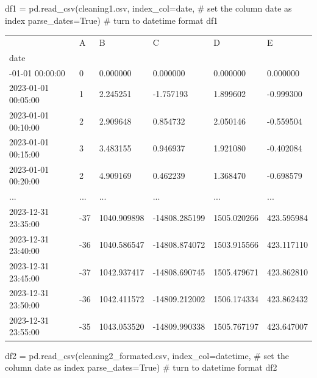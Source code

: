 \documentclass[
  letterpaper,
  DIV=11,
  numbers=noendperiod,
  oneside]{scrreprt}
\newenvironment{Shaded}{\begin{snugshade}}{\end{snugshade}}
\newcommand{\CommentTok}[1]{\textcolor[rgb]{0.37,0.37,0.37}{#1}}
\newcommand{\NormalTok}[1]{\textcolor[rgb]{0.00,0.23,0.31}{#1}}
\newcommand{\OperatorTok}[1]{\textcolor[rgb]{0.37,0.37,0.37}{#1}}
\newcommand{\StringTok}[1]{\textcolor[rgb]{0.13,0.47,0.30}{#1}}
\newcommand{\VariableTok}[1]{\textcolor[rgb]{0.07,0.07,0.07}{#1}}
\begin{document}
\begin{Shaded}
\begin{Highlighting}[]
\NormalTok{df1 }\OperatorTok{=}\NormalTok{ pd.read\_csv(}\StringTok{\textquotesingle{}cleaning1.csv\textquotesingle{}}\NormalTok{, }
\NormalTok{                  index\_col}\OperatorTok{=}\StringTok{\textquotesingle{}date\textquotesingle{}}\NormalTok{,     }\CommentTok{\# set the column date as index }
\NormalTok{                  parse\_dates}\OperatorTok{=}\VariableTok{True}\NormalTok{)     }\CommentTok{\# turn to datetime format}
\NormalTok{df1}
\end{Highlighting}
\end{Shaded}

\begin{longtable}[]{@{}llllll@{}}
\toprule\noalign{}
& A & B & C & D & E \\
date & & & & & \\
\midrule\noalign{}
\endhead
\bottomrule\noalign{}
\endlastfoot
2023-01-01 00:00:00 & 0 & 0.000000 & 0.000000 & 0.000000 & 0.000000 \\
2023-01-01 00:05:00 & 1 & 2.245251 & -1.757193 & 1.899602 & -0.999300 \\
2023-01-01 00:10:00 & 2 & 2.909648 & 0.854732 & 2.050146 & -0.559504 \\
2023-01-01 00:15:00 & 3 & 3.483155 & 0.946937 & 1.921080 & -0.402084 \\
2023-01-01 00:20:00 & 2 & 4.909169 & 0.462239 & 1.368470 & -0.698579 \\
... & ... & ... & ... & ... & ... \\
2023-12-31 23:35:00 & -37 & 1040.909898 & -14808.285199 & 1505.020266 &
423.595984 \\
2023-12-31 23:40:00 & -36 & 1040.586547 & -14808.874072 & 1503.915566 &
423.117110 \\
2023-12-31 23:45:00 & -37 & 1042.937417 & -14808.690745 & 1505.479671 &
423.862810 \\
2023-12-31 23:50:00 & -36 & 1042.411572 & -14809.212002 & 1506.174334 &
423.862432 \\
2023-12-31 23:55:00 & -35 & 1043.053520 & -14809.990338 & 1505.767197 &
423.647007 \\
\end{longtable}

\begin{Shaded}
\begin{Highlighting}[]
\NormalTok{df2 }\OperatorTok{=}\NormalTok{ pd.read\_csv(}\StringTok{\textquotesingle{}cleaning2\_formated.csv\textquotesingle{}}\NormalTok{, }
\NormalTok{                  index\_col}\OperatorTok{=}\StringTok{\textquotesingle{}datetime\textquotesingle{}}\NormalTok{,     }\CommentTok{\# set the column date as index }
\NormalTok{                  parse\_dates}\OperatorTok{=}\VariableTok{True}\NormalTok{)     }\CommentTok{\# turn to datetime format}
\NormalTok{df2}
\end{Highlighting}
\end{Shaded}
\end{document}
